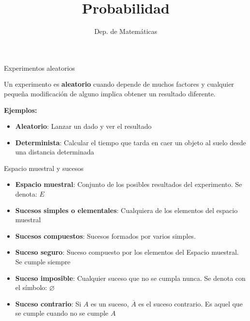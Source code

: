 \documentclass[11pt]{beamer}
\title{Probabilidad}
\date{}
\author{Dep. de Matemáticas}
\begin{document}
\begin{frame}
\titlepage
\end{frame}


\begin{frame}{Experimentos aleatorios}
\begin{block}{}
Un experimento es \textbf{aleatorio} cuando depende de muchos factores y cualquier pequeña modificación de alguno implica obtener un resultado diferente.
\end{block}
\pause
\textbf{Ejemplos:}
\begin{itemize}[<+->]
 \item \textbf{Aleatorio}: Lanzar un dado y ver el resultado
 \item \textbf{Determinista}: Calcular el tiempo que tarda en caer un objeto al suelo desde una distancia determinada
 \end{itemize} 

\end{frame}



\begin{frame}{Espacio muestral y sucesos}
\begin{itemize}[<+->]
\item \textbf{Espacio muestral}: Conjunto de los posibles resultados del experimento. Se denota: $E$
\item \textbf{Sucesos simples o elementales}: Cualquiera de los elementos del espacio muestral
\item \textbf{Sucesos compuestos}: Sucesos formados por varios simples. 
\item \textbf{Suceso seguro}: Suceso compuesto por los elementos del Espacio muestral. Se cumple siempre
\item \textbf{Suceso imposible}: Cualquier suceso que no se cumpla nunca. Se denota con el símbolo: $\varnothing$
\item \textbf{Suceso contrario}: Si $A$ es un suceso, $\overline{A}$ es el suceso contrario. Es aquel que se cumple cuando no se cumple $A$
\end{itemize}

\end{frame}
\end{document}
